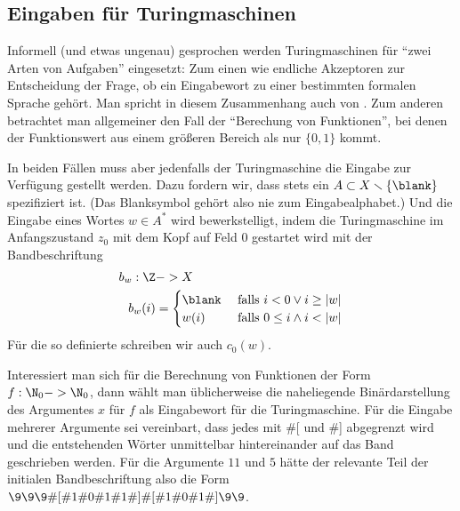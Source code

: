 \Tut\subsection{Eingaben f\"ur Turingmaschinen}
\label{subsec:tm-eingaben}

Informell (und etwas ungenau) gesprochen werden Turingmaschinen für
"`zwei Arten von Aufgaben"' eingesetzt: Zum einen wie endliche
Akzeptoren zur Entscheidung der Frage, ob ein Eingabewort zu einer
bestimmten formalen Sprache gehört. Man spricht in diesem Zusammenhang
auch von
.
Zum anderen betrachtet man allgemeiner den Fall der "`Berechung von
Funktionen"', bei denen der Funktionswert aus einem größeren Bereich
als nur $\{0,1\}$ kommt.

In beiden Fällen muss aber jedenfalls der Turingmaschine die Eingabe
zur Verfügung gestellt werden. Dazu fordern wir, dass stets ein
 $A\subset
X\smallsetminus\{\blank\}$ spezifiziert ist. (Das Blanksymbol gehört
also nie zum Eingabealphabet.) Und die Eingabe eines Wortes $w\in A^*$
wird bewerkstelligt, indem die Turingmaschine im Anfangszustand $z_0$
mit dem Kopf auf Feld $0$ gestartet wird mit der Bandbeschriftung
\begin{align*}
  b_w: \Z &-> X \\
        b_w(i) &=
        \begin{cases}
          \blank & \text{ falls } i< 0 \lor i\geq |w| \\
          w(i) & \text{ falls } 0\leq i \land i< |w| 
        \end{cases}
\end{align*}
%
Für die so definierte 
schreiben wir auch $c_0(w)$.

Interessiert man sich \zB für die Berechnung von Funktionen der Form
$f:\N_0 -> \N_0$, dann wählt man üblicherweise die naheliegende
Binärdarstellung des Argumentes $x$ für $f$ als Eingabewort für die
Turingmaschine. Für die Eingabe mehrerer Argumente sei vereinbart,
dass jedes mit \#[ und \#] abgegrenzt wird und die entstehenden Wörter
unmittelbar hintereinander auf das Band geschrieben werden. Für die
Argumente $11$ und $5$ hätte der relevante Teil der initialen
Bandbeschriftung also die Form
$\9\9\9\#[\#1\#0\#1\#1\#]\#[\#1\#0\#1\#]\9\9$.

